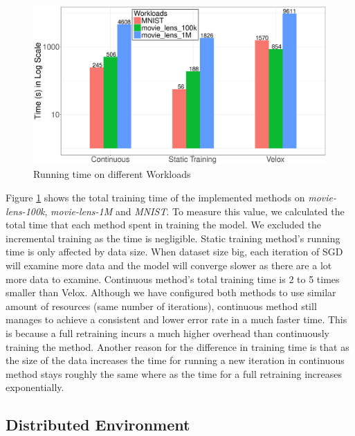 \documentclass{vldb}
\begin{document}
\begin{figure}[h]
\centering
\includegraphics[width=\columnwidth]{../images/experiment-results/times-log-scale-improved.eps}
 \caption{Running time on different Workloads}
 \label{fig:running-time}
 \end{figure}
Figure \ref{fig:running-time} shows the total training time of the implemented methods on \textit{movie-lens-100k}, \textit{movie-lens-1M} and \textit{MNIST}.
To measure this value, we calculated the total time that each method spent in training the model.
We excluded the incremental training as the time is negligible.
Static training method's running time is only affected by data size.
When dataset size big, each iteration of SGD will examine more data and the model will converge slower as there are a lot more data to examine.
Continuous method's total training time is 2 to 5 times smaller than Velox.
Although we have configured both methods to use similar amount of resources (same number of iterations), continuous method still manages to achieve a consistent and lower error rate in a much faster time.
This is because a full retraining incurs a much higher overhead than continuously training the method.
Another reason for the difference in training time is that as the size of the data increases the time for running a new iteration in continuous method stays roughly the same where as the time for a full retraining increases exponentially.
\subsection{Distributed Environment}
\end{document}
